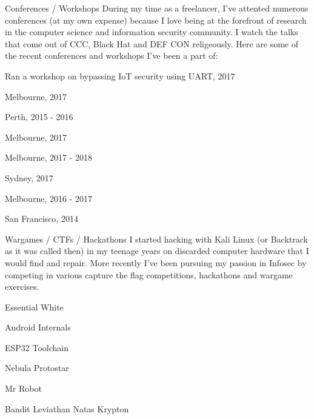 \begin{cventries}
    \cventrysimple
        {Conferences / Workshops}
        {
            During my time as a freelancer, I've attented numerous conferences (at my own expense) because I love being at the forefront of research in the computer science and information security community. I watch the talks that come out of CCC, Black Hat and DEF CON religeously. Here are some of the recent conferences and workshops I've been a part of:
        }
        {
            \begin{cvitems}
                \item { \acvSubItemSep Ran a workshop on bypassing IoT security using UART, 2017}
                \item { \acvSubItemSep Melbourne, 2017}
                \item { \acvSubItemSep Perth, 2015 - 2016}
                \item { \acvSubItemSep Melbourne, 2017}
                \item { \acvSubItemSep Melbourne, 2017 - 2018}
                \item { \acvSubItemSep Sydney, 2017}
                \item { \acvSubItemSep Melbourne, 2016 - 2017}
                \item { \acvSubItemSep San Francisco, 2014}
            \end{cvitems}
        }


    \cventrysimple
        {Wargames / CTFs / Hackathons}
        {
            I started hacking with Kali Linux (or Backtrack as it was called then) in my teenage years on discarded computer hardware that I would find and repair. More recently I've been pursuing my passion in Infosec by competing in various capture the flag competitions, hackathons and wargame exercises.
        }
        {
            \begin{cvitems}
                \item { \acvSubItemSep Essential \acvSubItemSep White}
                \item { }
                \item { \acvSubItemSep Android Internals}
                \item { \acvSubItemSep ESP32 Toolchain}
                \item { \acvSubItemSep Nebula \acvSubItemSep Protostar}
                \item { \acvSubItemSep Mr Robot}
                \item { \acvSubItemSep Bandit \acvSubItemSep Leviathan \acvSubItemSep Natas \acvSubItemSep Krypton}
            \end{cvitems}
        }


\end{cventries}
